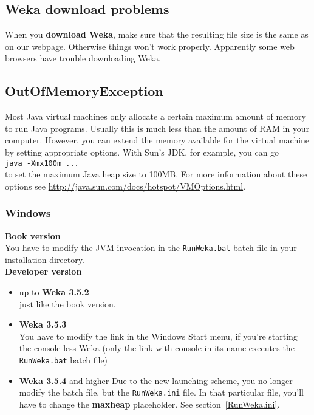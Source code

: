 \subsection{Weka download problems}
When you \textbf{download Weka}, make sure that the resulting file size is the
same as on our webpage. Otherwise things won't work
properly. Apparently some web browsers have trouble downloading Weka.

\subsection{OutOfMemoryException}
Most Java virtual machines only allocate a certain maximum amount of
memory to run Java programs. Usually this is much less than the amount
of RAM in your computer. However, you can extend the memory available
for the virtual machine by setting appropriate options. With Sun's
JDK, for example, you can go\\

\verb=java -Xmx100m ...=\\

\noindent to set the maximum Java heap size to 100MB. For more
information about these options see
\url{http://java.sun.com/docs/hotspot/VMOptions.html}{}.

\subsubsection{Windows}

\textbf{Book version}\\
You have to modify the JVM invocation
in the \verb=RunWeka.bat= batch file in your installation directory.\\

\noindent \textbf{Developer version}
\begin{itemize}
\item up to \textbf{Weka 3.5.2}\\
just like the book version.
\item \textbf{Weka 3.5.3}\\
You have to modify the link in the Windows Start menu, if you're starting the console-less Weka (only the link with console in its name executes the \verb=RunWeka.bat= batch file)
\item \textbf{Weka 3.5.4} and higher
Due to the new launching scheme, you no longer modify the batch file, but the \verb=RunWeka.ini= file. In that particular file, you'll have to change the \textbf{maxheap} placeholder. See section~\ref{RunWeka.ini}.
\end{itemize}

